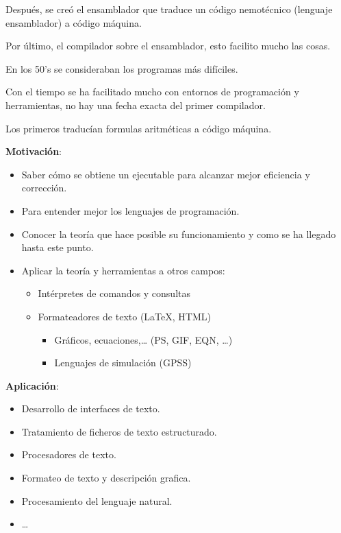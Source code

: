 \documentclass[12pt]{report} %
\begin{document}
Después, se creó el ensamblador que traduce un código nemotécnico
(lenguaje ensamblador) a código máquina.

Por último, el compilador sobre el ensamblador, esto facilito mucho las
cosas.

En los 50's se consideraban los programas más difíciles.

Con el tiempo se ha facilitado mucho con entornos de programación y
herramientas, no hay una fecha exacta del primer compilador.

Los primeros traducían formulas aritméticas a código máquina.

\textbf{Motivación}:

\begin{itemize}

\item
  Saber cómo se obtiene un ejecutable para alcanzar mejor eficiencia y
  corrección.
\item
  Para entender mejor los lenguajes de programación.
\item
  Conocer la teoría que hace posible su funcionamiento y como se ha
  llegado hasta este punto.
\item
  Aplicar la teoría y herramientas a otros campos:

  \begin{itemize}
  
  \item
    Intérpretes de comandos y consultas
  \item
    Formateadores de texto (LaTeX, HTML)

    \begin{itemize}
    
    \item
      Gráficos, ecuaciones,\ldots{} (PS, GIF, EQN, \ldots)
    \item
      Lenguajes de simulación (GPSS)
    \end{itemize}
  \end{itemize}
\end{itemize}

\textbf{Aplicación}:

\begin{itemize}

\item
  Desarrollo de interfaces de texto.
\item
  Tratamiento de ficheros de texto estructurado.
\item
  Procesadores de texto.
\item
  Formateo de texto y descripción grafica.
\item
  Procesamiento del lenguaje natural.
\item
  \ldots{}
\end{itemize}
\end{document}
